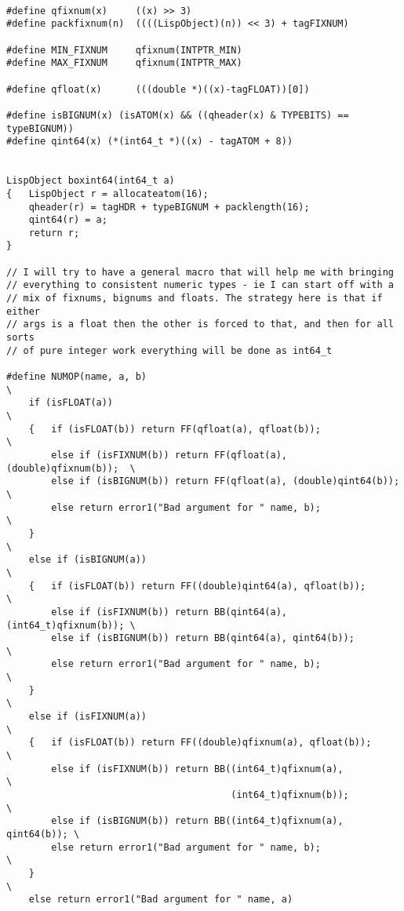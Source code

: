 
{\small\begin{verbatim}

#define qfixnum(x)     ((x) >> 3)
#define packfixnum(n)  ((((LispObject)(n)) << 3) + tagFIXNUM)

#define MIN_FIXNUM     qfixnum(INTPTR_MIN)
#define MAX_FIXNUM     qfixnum(INTPTR_MAX)

#define qfloat(x)      (((double *)((x)-tagFLOAT))[0])

#define isBIGNUM(x) (isATOM(x) && ((qheader(x) & TYPEBITS) == typeBIGNUM))
#define qint64(x) (*(int64_t *)((x) - tagATOM + 8))


LispObject boxint64(int64_t a)
{   LispObject r = allocateatom(16);
    qheader(r) = tagHDR + typeBIGNUM + packlength(16);
    qint64(r) = a;
    return r;
}

// I will try to have a general macro that will help me with bringing
// everything to consistent numeric types - ie I can start off with a
// mix of fixnums, bignums and floats. The strategy here is that if either
// args is a float then the other is forced to that, and then for all sorts
// of pure integer work everything will be done as int64_t

#define NUMOP(name, a, b)                                                \
    if (isFLOAT(a))                                                      \
    {   if (isFLOAT(b)) return FF(qfloat(a), qfloat(b));                 \
        else if (isFIXNUM(b)) return FF(qfloat(a), (double)qfixnum(b));  \
        else if (isBIGNUM(b)) return FF(qfloat(a), (double)qint64(b));   \
        else return error1("Bad argument for " name, b);                 \
    }                                                                    \
    else if (isBIGNUM(a))                                                \
    {   if (isFLOAT(b)) return FF((double)qint64(a), qfloat(b));         \
        else if (isFIXNUM(b)) return BB(qint64(a), (int64_t)qfixnum(b)); \
        else if (isBIGNUM(b)) return BB(qint64(a), qint64(b));           \
        else return error1("Bad argument for " name, b);                 \
    }                                                                    \
    else if (isFIXNUM(a))                                                \
    {   if (isFLOAT(b)) return FF((double)qfixnum(a), qfloat(b));        \
        else if (isFIXNUM(b)) return BB((int64_t)qfixnum(a),             \
                                        (int64_t)qfixnum(b));            \
        else if (isBIGNUM(b)) return BB((int64_t)qfixnum(a), qint64(b)); \
        else return error1("Bad argument for " name, b);                 \
    }                                                                    \
    else return error1("Bad argument for " name, a)


\end{verbatim}}
